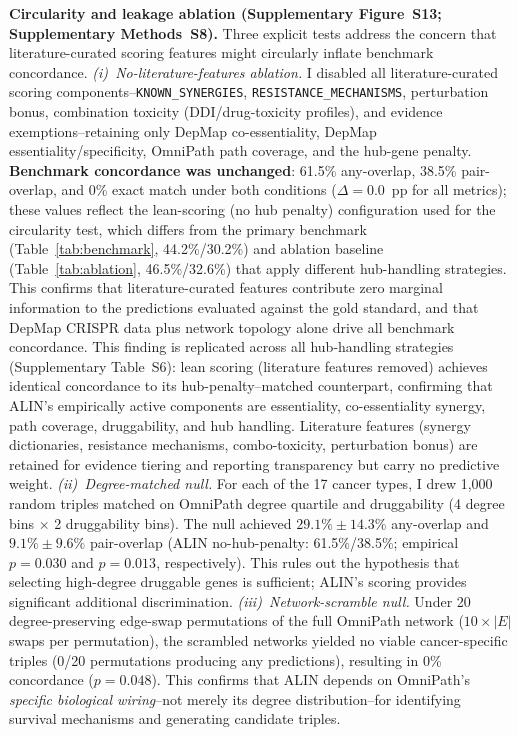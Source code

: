 \documentclass[11pt]{article}
\begin{document}
\textbf{Circularity and leakage ablation (Supplementary Figure~S13; Supplementary Methods~S8).}
Three explicit tests address the concern that literature-curated scoring features might circularly inflate benchmark concordance.
\emph{(i)~No-literature-features ablation.} I disabled all literature-curated scoring components--\texttt{KNOWN\_SYNERGIES}, \texttt{RESISTANCE\_MECHANISMS}, perturbation bonus, combination toxicity (DDI/drug-toxicity profiles), and evidence exemptions--retaining only DepMap co-essentiality, DepMap essentiality/specificity, OmniPath path coverage, and the hub-gene penalty. \textbf{Benchmark concordance was unchanged}: 61.5\% any-overlap, 38.5\% pair-overlap, and 0\% exact match under both conditions ($\Delta = 0.0$~pp for all metrics); these values reflect the lean-scoring (no hub penalty) configuration used for the circularity test, which differs from the primary benchmark (Table~\ref{tab:benchmark}, 44.2\%/30.2\%) and ablation baseline (Table~\ref{tab:ablation}, 46.5\%/32.6\%) that apply different hub-handling strategies. This confirms that literature-curated features contribute zero marginal information to the predictions evaluated against the gold standard, and that DepMap CRISPR data plus network topology alone drive all benchmark concordance. This finding is replicated across all hub-handling strategies (Supplementary Table~S6): lean scoring (literature features removed) achieves identical concordance to its hub-penalty--matched counterpart, confirming that ALIN's empirically active components are essentiality, co-essentiality synergy, path coverage, druggability, and hub handling. Literature features (synergy dictionaries, resistance mechanisms, combo-toxicity, perturbation bonus) are retained for evidence tiering and reporting transparency but carry no predictive weight.
\emph{(ii)~Degree-matched null.} For each of the 17 cancer types, I drew 1{,}000 random triples matched on OmniPath degree quartile and druggability (4 degree bins $\times$ 2 druggability bins). The null achieved $29.1\% \pm 14.3\%$ any-overlap and $9.1\% \pm 9.6\%$ pair-overlap (ALIN no-hub-penalty: 61.5\%/38.5\%; empirical $p = 0.030$ and $p = 0.013$, respectively). This rules out the hypothesis that selecting high-degree druggable genes is sufficient; ALIN's scoring provides significant additional discrimination.
\emph{(iii)~Network-scramble null.} Under 20 degree-preserving edge-swap permutations of the full OmniPath network ($10\times|E|$ swaps per permutation), the scrambled networks yielded no viable cancer-specific triples (0/20 permutations producing any predictions), resulting in 0\% concordance ($p = 0.048$). This confirms that ALIN depends on OmniPath's \emph{specific biological wiring}--not merely its degree distribution--for identifying survival mechanisms and generating candidate triples.
\end{document}

